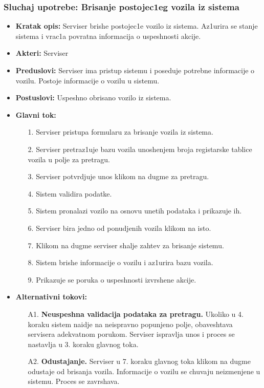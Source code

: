 \subsubsection{Sluchaj upotrebe: Brisanje postojec1eg vozila iz sistema}

\begin{itemize}
\item{\textbf{Kratak opis:} Serviser brishe postojec1e vozilo iz sistema. Az1urira se stanje sistema i vrac1a povratna informacija o uspeshnosti akcije.}
\item{\textbf{Akteri:} Serviser}

\item{\textbf{Preduslovi:} Serviser ima pristup sistemu i poseduje potrebne informacije o vozilu. Postoje informacije o vozilu u sistemu.}
\item{\textbf{Postuslovi:} Uspeshno obrisano vozilo iz sistema.}
\item{\textbf{Glavni tok:} 
\begin{enumerate}
    \item [1.] Serviser pristupa formularu za brisanje vozila iz sistema.
    \item[2.] Serviser pretraz1uje bazu vozila unoshenjem broja registarske tablice vozila u polje za pretragu.
    \item[3.] Serviser potvrdjuje unos klikom na dugme za pretragu.
    \item[4.] Sistem validira podatke.
    \item[5.] Sistem pronalazi vozilo na osnovu unetih podataka i prikazuje ih.
    \item[6.] Serviser bira jedno od ponudjenih vozila klikom na isto.
    \item[7.] Klikom na dugme serviser shalje zahtev za brisanje sistemu.
    \item[8.] Sistem brishe informacije o vozilu i az1urira bazu vozila.
    \item[9.] Prikazuje se poruka o uspeshnosti izvrshene akcije.
\end{enumerate}

}
\item{\textbf{Alternativni tokovi:} 
\begin{enumerate}
    \item [A1.] \textbf{Neuspeshna validacija podataka za pretragu.} Ukoliko u 4. koraku sistem naidje na neispravno popunjeno polje, obaveshtava servisera adekvatnom porukom. Serviser ispravlja unos i proces se nastavlja u 3. koraku glavnog toka.
    \item[A2.] \textbf{Odustajanje.} Serviser u 7. koraku glavnog toka klikom na dugme odustaje od brisanja vozila. Informacije o vozilu se chuvaju neizmenjene u sistemu. Proces se zavrshava.
\end{enumerate}
}
\end{itemize}

